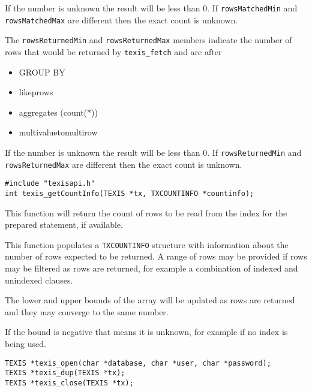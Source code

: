 If the number is unknown the result will be less than 0.  If
\verb`rowsMatchedMin` and \verb`rowsMatchedMax` are different then
the exact count is unknown.

The \verb`rowsReturnedMin`
and \verb`rowsReturnedMax` members indicate the number of rows that
would be returned by \verb`texis_fetch` and are after
\begin{itemize}
  \item GROUP BY
  \item likeprows
  \item aggregates (count(*))
  \item multivaluetomultirow
\end{itemize}

If the number is unknown the result will be less than 0.  If
\verb`rowsReturnedMin` and \verb`rowsReturnedMax` are different then
the exact count is unknown.




\SYNOPSIS
\begin{verbatim}
#include "texisapi.h"
int texis_getCountInfo(TEXIS *tx, TXCOUNTINFO *countinfo);
\end{verbatim}

\DESCRIPTION

This function will return the count of rows to be read from the index
for the prepared statement, if available.

\CAVEATS

This function populates a \verb`TXCOUNTINFO` structure with information
about the number of rows expected to be returned.  A range of rows may be
provided if rows may be filtered as rows are returned, for example a
combination of indexed and unindexed clauses.

The lower and upper bounds of the array will be updated as rows are returned
and they may converge to the same number.

If the bound is negative that means it is unknown, for example if no index
is being used.


\SYNOPSIS
\begin{verbatim}
TEXIS *texis_open(char *database, char *user, char *password);
TEXIS *texis_dup(TEXIS *tx);
TEXIS *texis_close(TEXIS *tx);
\end{verbatim}

